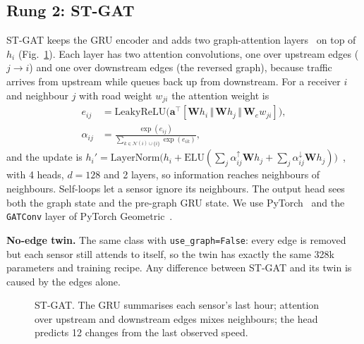 \documentclass[conference]{IEEEtran}
\begin{document}
\subsection{Rung 2: ST-GAT}
ST-GAT keeps the GRU encoder and adds two graph-attention layers~\cite{velickovic2018gat} on top of $h_i$ (Fig.~\ref{fig:arch}). Each layer has two attention convolutions, one over upstream edges ($j\to i$) and one over downstream edges (the reversed graph), because traffic arrives from upstream while queues back up from downstream. For a receiver $i$ and neighbour $j$ with road weight $w_{ji}$ the attention weight is
\begin{align}
e_{ij}&=\mathrm{LeakyReLU}\big(\mathbf{a}^\top[\mathbf{W}h_i\,\Vert\,\mathbf{W}h_j\,\Vert\,\mathbf{W}_e w_{ji}]\big),\\
\alpha_{ij}&=\frac{\exp(e_{ij})}{\sum_{k\in\mathcal{N}(i)\cup\{i\}}\exp(e_{ik})},
\end{align}
and the update is $h_i'=\mathrm{LayerNorm}\big(h_i+\mathrm{ELU}(\sum_j\alpha^{\uparrow}_{ij}\mathbf{W}h_j+\sum_j\alpha^{\downarrow}_{ij}\mathbf{W}h_j)\big)$~\cite{ba2016layernorm}, with 4 heads, $d=128$ and 2 layers, so information reaches neighbours of neighbours. Self-loops let a sensor ignore its neighbours. The output head sees both the graph state and the pre-graph GRU state. We use PyTorch~\cite{paszke2019pytorch} and the \texttt{GATConv} layer of PyTorch Geometric~\cite{fey2019pyg}.

\textbf{No-edge twin.} The same class with \texttt{use\_graph=False}: every edge is removed but each sensor still attends to itself, so the twin has exactly the same 328k parameters and training recipe. Any difference between ST-GAT and its twin is caused by the edges alone.

\begin{figure}[t]
\centering
{}
\caption{ST-GAT. The GRU summarises each sensor's last hour; attention over upstream and downstream edges mixes neighbours; the head predicts 12 changes from the last observed speed.}
\label{fig:arch}
\end{figure}
\end{document}
